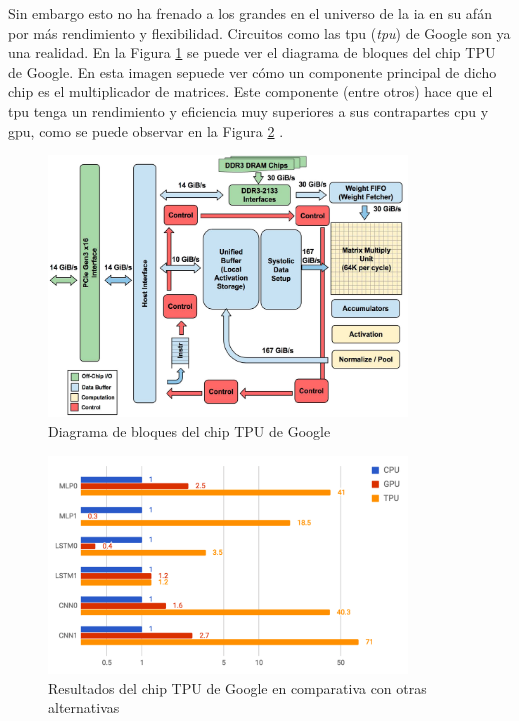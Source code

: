 Sin embargo esto no ha frenado a los grandes en el universo de la \acrshort{ia} en su afán por más rendimiento y flexibilidad. Circuitos como las \acrshort{tpu} (\textit{\acrlong{tpu}}) de Google son ya una realidad. En la Figura \ref{fig:tpu_block_diagram} \cite{jouppi2017_in_datacenter_tpu} se puede ver el diagrama de bloques del chip TPU de Google. En esta imagen sepuede ver cómo un componente principal de dicho chip es el multiplicador de matrices. Este componente (entre otros) hace que el \acrshort{tpu} tenga un rendimiento y eficiencia muy superiores a sus contrapartes \acrshort{cpu} y \acrshort{gpu}, como se puede observar en la Figura \ref{fig:tpu_benchmarks} \cite{devopedia_tpu}. 

\begin{figure}[h!]
    \centering
    \includegraphics[width=0.85\textwidth]{img/tpu_block_diagram.jpg}
    \caption{Diagrama de bloques del chip TPU de Google}
    \label{fig:tpu_block_diagram}
\end{figure}

\begin{figure}[h!]
    \centering
    \includegraphics[width=0.85\textwidth]{img/tpu_benchmarks.png}
    \caption{Resultados del chip TPU de Google en comparativa con otras alternativas}
    \label{fig:tpu_benchmarks}
\end{figure}

